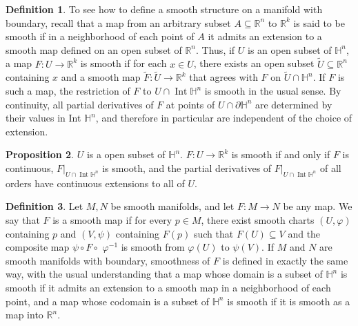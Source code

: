 \documentclass[12pt,a4paper]{book}
\newcommand{\bb}[1]{\mathbb{#1}}
\theoremstyle{definition}
\newtheorem{defn}{Definition}[section]
\newtheorem{prop}[defn]{Proposition}
\begin{document}
\begin{defn}
    To see how to define a smooth structure on a manifold
    with boundary, recall that a map from an arbitrary subset
    $A \subseteq \mathbb{R}^n$ to $\mathbb{R}^k$ is said to be smooth if in a neighborhood of each point of $A$ it admits an extension to a smooth map defined on an open subset of $\mathbb{R}^n$.
    Thus, if $U$ is an open subset of $\mathbb{H}^n$, a map $F: U \rightarrow \mathbb{R}^k$ is smooth
    if for each $x \in U$, there exists an open subset $\widetilde{U} \subseteq \mathbb{R}^n$ containing $x$
    and a smooth map $\widetilde{F}: \widetilde{U} \rightarrow \mathbb{R}^k$ that agrees with $F$ on $\widetilde{U} \cap \mathbb{H}^n$.
    If $F$ is such a map, the restriction of $F$ to $U \cap \operatorname{Int} \mathbb{H}^n$ is smooth in the usual sense.
    By continuity, all partial derivatives of $F$ at points of $U \cap \partial \mathbb{H}^n$ are determined by their values in Int $\mathbb{H}^n$, and therefore in particular are independent of the choice of extension.
\end{defn}
\begin{prop}
    $U$ is a open subset of $\bb{H}^n$. $F: U \rightarrow \mathbb{R}^k$ is smooth if and only
    if $F$ is continuous, $\left.F\right|_{U \cap \operatorname{Int} \mathbb{H}^n}$ is smooth, and the partial derivatives of $\left.F\right|_{U \cap \operatorname{Int} \mathbb{H}^n}$ of all orders have continuous extensions to all of $U$.
\end{prop}
\begin{defn}
    Let $M, N$ be smooth manifolds, and let
    $F: M \rightarrow N$ be any map. We say
    that $F$ is a smooth map if for every $p \in M$, there exist smooth charts $(U, \varphi)$ containing $p$ and $(V, \psi)$ containing $F(p)$ such that $F(U) \subseteq V$ and the composite map $\psi \circ F \circ$ $\varphi^{-1}$ is smooth from $\varphi(U)$ to $\psi(V)$. If $M$ and $N$ are smooth manifolds with boundary, smoothness of $F$ is defined in exactly the same way, with the usual understanding that a map whose domain is a subset of $\mathbb{H}^n$ is smooth if it admits an extension to
    a smooth map in a neighborhood of each point, and a map whose codomain is a subset of $\mathbb{H}^n$ is smooth if it is smooth as a map into $\mathbb{R}^n$.
\end{defn}
\end{document}
